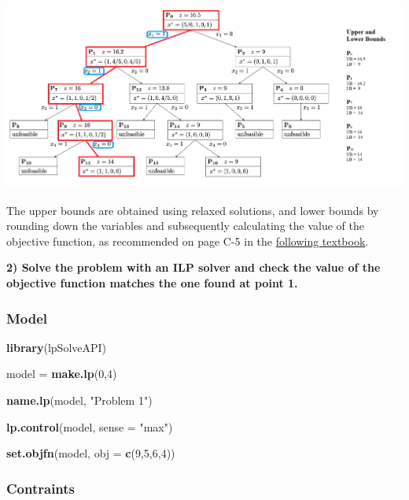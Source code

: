 \documentclass[]{article}
\newenvironment{Shaded}{\begin{snugshade}}{\end{snugshade}}
\newcommand{\DataTypeTok}[1]{\textcolor[rgb]{0.13,0.29,0.53}{#1}}
\newcommand{\DecValTok}[1]{\textcolor[rgb]{0.00,0.00,0.81}{#1}}
\newcommand{\KeywordTok}[1]{\textcolor[rgb]{0.13,0.29,0.53}{\textbf{#1}}}
\newcommand{\NormalTok}[1]{#1}
\newcommand{\StringTok}[1]{\textcolor[rgb]{0.31,0.60,0.02}{#1}}
\begin{document}
\includegraphics[width=8.33333in,height=\textheight]{BranchTree.png}

The upper bounds are obtained using relaxed solutions, and lower bounds
by rounding down the variables and subsequently calculating the value of
the objective function, as recommended on page C-5 in the
\href{http://web.tecnico.ulisboa.pt/mcasquilho/compute/_linpro/TaylorB_module_c.pdf}{following
textbook}.

\textbf{2) Solve the problem with an ILP solver and check the value of
the objective function matches the one found at point 1.}

\hypertarget{model}{%
\subsubsection{Model}\label{model}}

\begin{Shaded}
\begin{Highlighting}[]
\KeywordTok{library}\NormalTok{(lpSolveAPI)}

\NormalTok{model =}\StringTok{ }\KeywordTok{make.lp}\NormalTok{(}\DecValTok{0}\NormalTok{,}\DecValTok{4}\NormalTok{)}

\KeywordTok{name.lp}\NormalTok{(model, }\StringTok{"Problem 1"}\NormalTok{)}

\KeywordTok{lp.control}\NormalTok{(model, }\DataTypeTok{sense =} \StringTok{"max"}\NormalTok{)}

\KeywordTok{set.objfn}\NormalTok{(model, }\DataTypeTok{obj =} \KeywordTok{c}\NormalTok{(}\DecValTok{9}\NormalTok{,}\DecValTok{5}\NormalTok{,}\DecValTok{6}\NormalTok{,}\DecValTok{4}\NormalTok{))}
\end{Highlighting}
\end{Shaded}

\hypertarget{contraints}{%
\subsubsection{Contraints}\label{contraints}}
\end{document}
